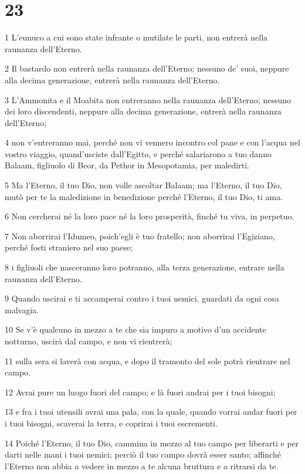 \chapter{23}

\par 1 L'eunuco a cui sono state infrante o mutilate le parti, non entrerà nella raunanza dell'Eterno.
\par 2 Il bastardo non entrerà nella raunanza dell'Eterno; nessuno de' suoi, neppure alla decima generazione, entrerà nella raunanza dell'Eterno.
\par 3 L'Ammonita e il Moabita non entreranno nella raunanza dell'Eterno; nessuno dei loro discendenti, neppure alla decima generazione, entrerà nella raunanza dell'Eterno;
\par 4 non v'entreranno mai, perché non vi vennero incontro col pane e con l'acqua nel vostro viaggio, quand'usciste dall'Egitto, e perché salariarono a tuo danno Balaam, figliuolo di Beor, da Pethor in Mesopotamia, per maledirti.
\par 5 Ma l'Eterno, il tuo Dio, non volle ascoltar Balaam; ma l'Eterno, il tuo Dio, mutò per te la maledizione in benedizione perché l'Eterno, il tuo Dio, ti ama.
\par 6 Non cercherai né la loro pace né la loro prosperità, finché tu viva, in perpetuo.
\par 7 Non aborrirai l'Idumeo, poich'egli è tuo fratello; non aborrirai l'Egiziano, perché fosti straniero nel suo paese;
\par 8 i figliuoli che nasceranno loro potranno, alla terza generazione, entrare nella raunanza dell'Eterno.
\par 9 Quando uscirai e ti accamperai contro i tuoi nemici, guardati da ogni cosa malvagia.
\par 10 Se v'è qualcuno in mezzo a te che sia impuro a motivo d'un accidente notturno, uscirà dal campo, e non vi rientrerà;
\par 11 sulla sera si laverà con acqua, e dopo il tramonto del sole potrà rientrare nel campo.
\par 12 Avrai pure un luogo fuori del campo; e là fuori andrai per i tuoi bisogni;
\par 13 e fra i tuoi utensili avrai una pala, con la quale, quando vorrai andar fuori per i tuoi bisogni, scaverai la terra, e coprirai i tuoi escrementi.
\par 14 Poiché l'Eterno, il tuo Dio, cammina in mezzo al tuo campo per liberarti e per darti nelle mani i tuoi nemici; perciò il tuo campo dovrà esser santo; affinché l'Eterno non abbia a vedere in mezzo a te alcuna bruttura e a ritrarsi da te.
